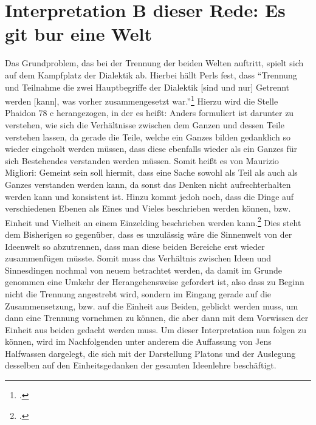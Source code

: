 \section{Interpretation B dieser Rede: Es git bur eine Welt}
Das Grundproblem, das bei der Trennung der beiden Welten auftritt, spielt sich auf dem Kampfplatz der Dialektik ab. Hierbei hällt Perls fest, dass \enquote{Trennung und Teilnahme die zwei Hauptbegriffe der Dialektik [sind und nur] Getrennt werden [kann], was vorher zusammengesetzt war.}\footcite[vgl.][S. 349]{Perls}
Hierzu wird die Stelle Phaidon 78 c herangezogen, in der es heißt:
Anders formuliert ist darunter zu verstehen, wie sich die Verhältnisse zwischen dem Ganzen und dessen Teile verstehen lassen, da gerade die Teile, welche ein Ganzes bilden gedanklich so wieder eingeholt werden müssen, dass diese ebenfalls wieder als ein Ganzes für sich Bestehendes verstanden werden müssen. Somit heißt es von Maurizio Migliori:
Gemeint sein soll hiermit, dass eine Sache sowohl als Teil als auch als Ganzes verstanden werden kann, da sonst das Denken nicht aufrechterhalten werden kann und konsistent ist.
Hinzu kommt jedoh noch, dass die Dinge auf verschiedenen Ebenen als Eines und Vieles beschrieben werden können, bzw. Einheit und Vielheit an einem Einzelding beschrieben werden kann.\footcite[vgl.][S. 112]{Migliori}
Dies steht dem Bisherigen so gegenüber, dass es unzulässig wäre die Sinnenwelt von der Ideenwelt so abzutrennen, dass man diese beiden Bereiche erst wieder zusammenfügen müsste.
Somit muss das Verhältnis zwischen Ideen und Sinnesdingen nochmal von neuem betrachtet werden, da damit im Grunde genommen eine Umkehr der Herangehensweise gefordert ist, also dass zu Beginn nicht die Trennung angestrebt wird, sondern im Eingang gerade auf die Zusammensetzung, bzw. auf die Einheit aus Beiden, geblickt werden muss, um dann eine Trennung vornehmen zu können, die aber dann mit dem Vorwissen der Einheit aus beiden gedacht werden muss.
Um dieser Interpretation nun folgen zu können, wird im Nachfolgenden unter anderem die Auffassung von Jens Halfwassen dargelegt, die sich mit der Darstellung Platons und der Auslegung desselben auf den Einheitsgedanken der gesamten Ideenlehre beschäftigt.
